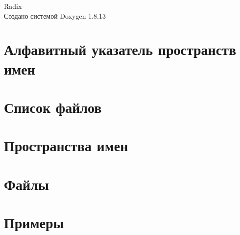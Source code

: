 \documentclass[twoside]{book}
\newcommand{\+}{\discretionary{\mbox{\scriptsize$\hookleftarrow$}}{}{}}
\newcommand{\clearemptydoublepage}{%
  \newpage{\pagestyle{empty}\cleardoublepage}%
}
\begin{document}
\hypersetup{pageanchor=false,
             bookmarksnumbered=true,
             pdfencoding=unicode
            }
\begin{titlepage}
\vspace*{7cm}
\begin{center}%
{\Large Radix }\\
\vspace*{1cm}
{\large Создано системой Doxygen 1.8.13}\\
\end{center}
\end{titlepage}
\clearemptydoublepage
{}
\tableofcontents
\clearemptydoublepage
{}
\hypersetup{pageanchor=true}

\chapter{Алфавитный указатель пространств имен}

\chapter{Список файлов}

\chapter{Пространства имен}



\chapter{Файлы}




































\chapter{Примеры}

















\backmatter
\newpage
{}
\clearemptydoublepage
{}
\printindex
\end{document}
